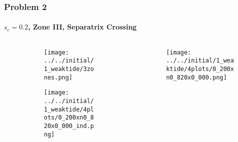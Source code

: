 \documentclass[dvipsnames, 11pt]{beamer}
\begin{document}
\begin{frame}
    \frametitle{Problem 2}
    \framesubtitle{$s_c = 0.2$, Zone III, Separatrix Crossing}

    \begin{columns}
        \begin{column}{0.5\textwidth}
            \begin{figure}
                \centering
                \begin{subfigure}{\columnwidth}
                    \centering
                    \texttt{[image: ../../initial/1\_weaktide/3zones.png]}
                \end{subfigure}

                \begin{subfigure}{\columnwidth}
                    \centering
                    \texttt{[image: ../../initial/1\_weaktide/4plots/0\_200xn0\_820x0\_000\_ind.png]}
                \end{subfigure}
            \end{figure}
        \end{column}
        \begin{column}{0.5\textwidth}
            \begin{figure}[t]
                \centering
                \texttt{[image: ../../initial/1\_weaktide/4plots/0\_200xn0\_820x0\_000.png]}
            \end{figure}
        \end{column}
    \end{columns}
\end{frame}
\end{document}
